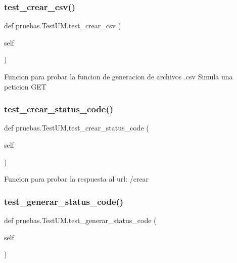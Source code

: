 \subsubsection{\texorpdfstring{test\+\_\+crear\+\_\+csv()}{test\_crear\_csv()}}
{\footnotesize\ttfamily def pruebas.\+Test\+U\+M.\+test\+\_\+crear\+\_\+csv (\begin{DoxyParamCaption}\item[{}]{self }\end{DoxyParamCaption})}

\begin{DoxyVerb}Funcion para probar la funcion de generacion de archivos .csv
Simula una peticion GET
\end{DoxyVerb}
 \mbox{\label{classpruebas_1_1_test_u_m_a152091a0b91cda976f0ef41a6feef968}} 
\subsubsection{\texorpdfstring{test\+\_\+crear\+\_\+status\+\_\+code()}{test\_crear\_status\_code()}}
{\footnotesize\ttfamily def pruebas.\+Test\+U\+M.\+test\+\_\+crear\+\_\+status\+\_\+code (\begin{DoxyParamCaption}\item[{}]{self }\end{DoxyParamCaption})}

\begin{DoxyVerb}Funcion para probar la respuesta al url: /crear
\end{DoxyVerb}
 \mbox{\label{classpruebas_1_1_test_u_m_a3aa8f257e52cba3f778181f02241ce63}} 
\subsubsection{\texorpdfstring{test\+\_\+generar\+\_\+status\+\_\+code()}{test\_generar\_status\_code()}}
{\footnotesize\ttfamily def pruebas.\+Test\+U\+M.\+test\+\_\+generar\+\_\+status\+\_\+code (\begin{DoxyParamCaption}\item[{}]{self }\end{DoxyParamCaption})}

